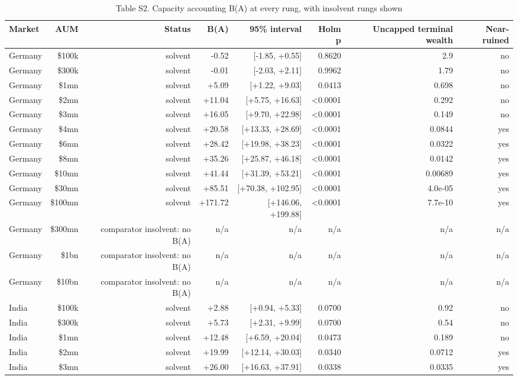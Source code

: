 \begin{table}[t]
\centering
\small
\caption{Table S2. Capacity accounting B(A) at every rung, with insolvent rungs shown}
\label{tab:s2}
\begin{tabular}{lrrrrrrr}
\toprule
Market & AUM & Status & B(A) & 95\% interval & Holm p & Uncapped terminal wealth & Near-ruined \\
\midrule
Germany & \$100k & solvent & -0.52 & [-1.85, +0.55] & 0.8620 & 2.9 & no \\
Germany & \$300k & solvent & -0.01 & [-2.03, +2.11] & 0.9962 & 1.79 & no \\
Germany & \$1mn & solvent & +5.09 & [+1.22, +9.03] & 0.0413 & 0.698 & no \\
Germany & \$2mn & solvent & +11.04 & [+5.75, +16.63] & <0.0001 & 0.292 & no \\
Germany & \$3mn & solvent & +16.05 & [+9.70, +22.98] & <0.0001 & 0.149 & no \\
Germany & \$4mn & solvent & +20.58 & [+13.33, +28.69] & <0.0001 & 0.0844 & yes \\
Germany & \$6mn & solvent & +28.42 & [+19.98, +38.23] & <0.0001 & 0.0322 & yes \\
Germany & \$8mn & solvent & +35.26 & [+25.87, +46.18] & <0.0001 & 0.0142 & yes \\
Germany & \$10mn & solvent & +41.44 & [+31.39, +53.21] & <0.0001 & 0.00689 & yes \\
Germany & \$30mn & solvent & +85.51 & [+70.38, +102.95] & <0.0001 & 4.0e-05 & yes \\
Germany & \$100mn & solvent & +171.72 & [+146.06, +199.88] & <0.0001 & 7.7e-10 & yes \\
Germany & \$300mn & comparator insolvent: no B(A) & n/a & n/a & n/a & n/a & n/a \\
Germany & \$1bn & comparator insolvent: no B(A) & n/a & n/a & n/a & n/a & n/a \\
Germany & \$10bn & comparator insolvent: no B(A) & n/a & n/a & n/a & n/a & n/a \\
India & \$100k & solvent & +2.88 & [+0.94, +5.33] & 0.0700 & 0.92 & no \\
India & \$300k & solvent & +5.73 & [+2.31, +9.99] & 0.0700 & 0.54 & no \\
India & \$1mn & solvent & +12.48 & [+6.59, +20.04] & 0.0473 & 0.189 & no \\
India & \$2mn & solvent & +19.99 & [+12.14, +30.03] & 0.0340 & 0.0712 & yes \\
India & \$3mn & solvent & +26.00 & [+16.63, +37.91] & 0.0338 & 0.0335 & yes \\

\end{tabular}
\end{table}
